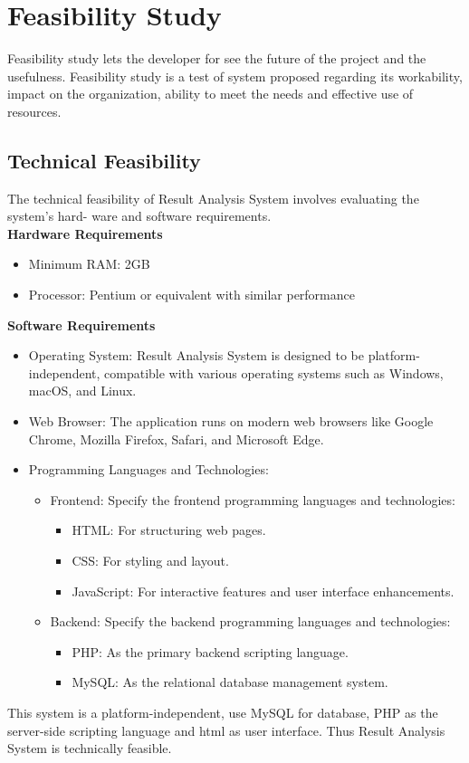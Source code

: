 \documentclass{nascproject}
\begin{document}
\section{Feasibility Study}
Feasibility study lets the developer for see the future of the project and the usefulness.
Feasibility study is a test of system proposed regarding its workability, impact on the
organization, ability to meet the needs and effective use of resources.

    \subsection {Technical Feasibility}
    The technical feasibility of Result Analysis System involves evaluating the system’s hard-
    ware and software requirements.\\
    
    \textbf{Hardware Requirements}
    \begin{itemize}
    	\item  Minimum RAM: 2GB
    	\item Processor: Pentium or equivalent with similar performance
    \end{itemize}
   
    
    \textbf{Software Requirements}
    \begin{itemize}
    	\item Operating System: Result Analysis System is designed to be platform-independent,
    	compatible with various operating systems such as Windows, macOS, and
    	Linux.
    	\item  Web Browser: The application runs on modern web browsers like Google
    	Chrome, Mozilla Firefox, Safari, and Microsoft Edge.
    	\item Programming Languages and Technologies:
    	\begin{itemize}
    		\item 	Frontend: Specify the frontend programming languages and technologies:
    		\begin{itemize}
    			\item HTML: For structuring web pages.
    			\item CSS: For styling and layout.
    			\item 	JavaScript: For interactive features and user interface enhancements.
    		\end{itemize}
    		\item 	Backend: Specify the backend programming languages and technologies:
    		\begin{itemize}
    			\item PHP: As the primary backend scripting language.
    			\item 	MySQL: As the relational database management system.
    		\end{itemize}
    	\end{itemize}	
   \end{itemize}
This system is a platform-independent, use MySQL for database, PHP as the server-side scripting language and html as user interface. Thus Result Analysis System is technically feasible.	
\end{document}
